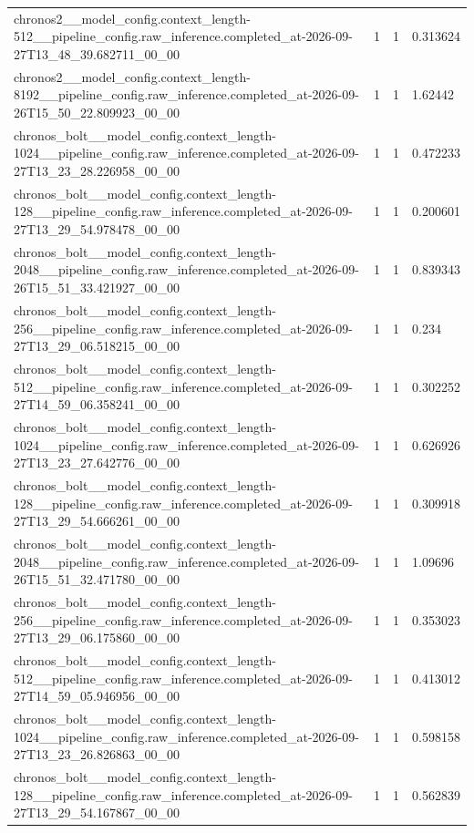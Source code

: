 \begin{tabular}{llll}
chronos2\_\_model\_config.context\_length-512\_\_pipeline\_config.raw\_inference.completed\_at-2026-09-27T13\_48\_39.682711\_00\_00 & 1 & 1 & 0.313624 \\
chronos2\_\_model\_config.context\_length-8192\_\_pipeline\_config.raw\_inference.completed\_at-2026-09-26T15\_50\_22.809923\_00\_00 & 1 & 1 & 1.62442 \\
chronos\_bolt\_\_model\_config.context\_length-1024\_\_pipeline\_config.raw\_inference.completed\_at-2026-09-27T13\_23\_28.226958\_00\_00 & 1 & 1 & 0.472233 \\
chronos\_bolt\_\_model\_config.context\_length-128\_\_pipeline\_config.raw\_inference.completed\_at-2026-09-27T13\_29\_54.978478\_00\_00 & 1 & 1 & 0.200601 \\
chronos\_bolt\_\_model\_config.context\_length-2048\_\_pipeline\_config.raw\_inference.completed\_at-2026-09-26T15\_51\_33.421927\_00\_00 & 1 & 1 & 0.839343 \\
chronos\_bolt\_\_model\_config.context\_length-256\_\_pipeline\_config.raw\_inference.completed\_at-2026-09-27T13\_29\_06.518215\_00\_00 & 1 & 1 & 0.234 \\
chronos\_bolt\_\_model\_config.context\_length-512\_\_pipeline\_config.raw\_inference.completed\_at-2026-09-27T14\_59\_06.358241\_00\_00 & 1 & 1 & 0.302252 \\
chronos\_bolt\_\_model\_config.context\_length-1024\_\_pipeline\_config.raw\_inference.completed\_at-2026-09-27T13\_23\_27.642776\_00\_00 & 1 & 1 & 0.626926 \\
chronos\_bolt\_\_model\_config.context\_length-128\_\_pipeline\_config.raw\_inference.completed\_at-2026-09-27T13\_29\_54.666261\_00\_00 & 1 & 1 & 0.309918 \\
chronos\_bolt\_\_model\_config.context\_length-2048\_\_pipeline\_config.raw\_inference.completed\_at-2026-09-26T15\_51\_32.471780\_00\_00 & 1 & 1 & 1.09696 \\
chronos\_bolt\_\_model\_config.context\_length-256\_\_pipeline\_config.raw\_inference.completed\_at-2026-09-27T13\_29\_06.175860\_00\_00 & 1 & 1 & 0.353023 \\
chronos\_bolt\_\_model\_config.context\_length-512\_\_pipeline\_config.raw\_inference.completed\_at-2026-09-27T14\_59\_05.946956\_00\_00 & 1 & 1 & 0.413012 \\
chronos\_bolt\_\_model\_config.context\_length-1024\_\_pipeline\_config.raw\_inference.completed\_at-2026-09-27T13\_23\_26.826863\_00\_00 & 1 & 1 & 0.598158 \\
chronos\_bolt\_\_model\_config.context\_length-128\_\_pipeline\_config.raw\_inference.completed\_at-2026-09-27T13\_29\_54.167867\_00\_00 & 1 & 1 & 0.562839 \\

\end{tabular}
